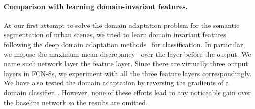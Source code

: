 \paragraph{Comparison with learning domain-invariant features.} At our first attempt to solve the domain adaptation problem for the semantic segmentation of urban scenes, we tried to learn domain invariant features following the deep domain adaptation methods~\cite{LongICML15Learning} for classification. In particular, we impose the maximum mean discrepancy~\cite{gretton2012kernel}  over the layer before the output. We name such network layer the feature layer. Since there are virtually three output layers in FCN-8s, we experiment with all the three feature layers correspondingly. We have also tested the domain adaptation by reversing the gradients of a domain classifier~\cite{GaninICML15Unsupervised}. However, none of these efforts lead to any noticeable gain over the baseline network so the results are omitted. 

















